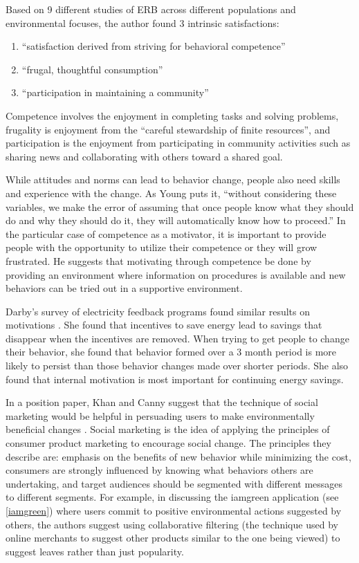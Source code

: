 Based on 9 different studies of ERB across different populations and environmental focuses, the author found 3 intrinsic satisfactions:
\begin{enumerate}
	\item ``satisfaction derived from striving for behavioral competence''
	\item ``frugal, thoughtful consumption''
	\item ``participation in maintaining a community''
\end{enumerate}
Competence involves the enjoyment in completing tasks and solving problems, frugality is enjoyment from the ``careful stewardship of finite resources'', and 
participation is the enjoyment from participating in community activities such as sharing news and collaborating with others toward a shared goal.

While attitudes and norms can lead to behavior change, people also need skills and experience with the change. As Young puts it, ``without considering these variables, we make the error of assuming that once people know what they should do and why they should do it, they will automatically know how to proceed.'' In the particular case of competence as a motivator, it is important to provide people with the opportunity to utilize their competence or they will grow frustrated. He suggests that motivating through competence be done by providing an environment where information on procedures is available and new behaviors can be tried out in a supportive environment.

Darby's survey of electricity feedback programs found similar results on motivations \cite{darby-review-2006}. She found that incentives to save energy lead to savings that disappear when the incentives are removed. When trying to get people to change their behavior, she found that behavior formed over a 3 month period is more likely to persist than those behavior changes made over shorter periods. She also found that internal motivation is most important for continuing energy savings.

In a position paper, Khan and Canny suggest that the technique of social marketing would be helpful in persuading users to make environmentally beneficial changes \cite{Khan2008-social-marketing}. Social marketing is the idea of applying the principles of consumer product marketing to encourage social change. The principles they describe are: emphasis on the benefits of new behavior while minimizing the cost, consumers are strongly influenced by knowing what behaviors others are undertaking, and target audiences should be segmented with different messages to different segments. For example, in discussing the iamgreen application (see \autoref{iamgreen}) where users commit to positive environmental actions suggested by others, the authors suggest using collaborative filtering (the technique used by online merchants to suggest other products similar to the one being viewed) to suggest leaves rather than just popularity.

